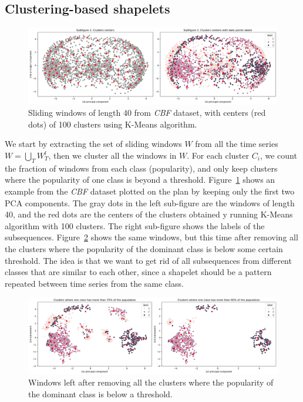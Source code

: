 \documentclass[sigconf, nonacm]{acmart}
\begin{document}
\subsection{Clustering-based shapelets}
\begin{figure}
	\includegraphics[width=\textwidth]{imgs/clustering.png}
	\caption{Sliding windows of length 40 from \emph{CBF} dataset, with centers
		(red dots) of 100 clusters using K-Means algorithm.\label{fig:clustering}}
\end{figure}
We start by extracting the set of sliding windows $W$ from all the time series
$W = \bigcup_T W_T^l$, then we cluster all the windows in $W$.
For each cluster $C_i$, we count the fraction of windows from each class
(popularity), and only keep clusters where the popularity of one class is beyond
a threshold. Figure~\ref{fig:clustering} shows an example from the \emph{CBF}
dataset plotted on the plan by keeping only the first two PCA components. The
gray dots in the left sub-figure are the windows of length 40, and the red dots
are the centers of the clusters obtained y running K-Means algorithm with 100
clusters. The right sub-figure shows the labels of the subsequences.
Figure~\ref{fig:clustering_threshold} shows the same windows, but this time
after removing all the clusters where the popularity of the dominant class is
below some certain threshold.
The idea is that we want to get rid of all subsequences from different classes
that are similar to each other, since a shapelet should be a pattern repeated
between time series from the same class.
\begin{figure}
	\includegraphics[width=\textwidth]{imgs/clustering_thresholds.png}
	\caption{Windows left after removing all the clusters where the popularity of
		the dominant class is below a threshold\label{fig:clustering_threshold}.}
\end{figure}
\end{document}
